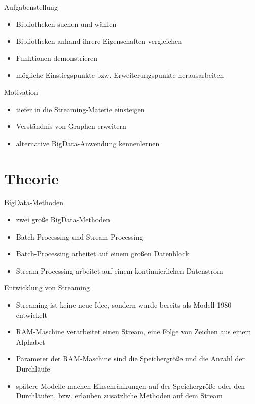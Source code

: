 \documentclass[a4paper, fontsize=11pt]{beamer}
\begin{document}
\begin{frame}{Aufgabenstellung}
    \begin{itemize}
        \item Bibliotheken suchen und wählen
        \item Bibliotheken anhand ihrere Eigenschaften vergleichen
        \item Funktionen demonstrieren
        \item mögliche Einstiegspunkte bzw. Erweiterungspunkte herausarbeiten
    \end{itemize}
\end{frame}

\begin{frame}{Motivation}
    \begin{itemize}
        \item tiefer in die Streaming-Materie einsteigen
        \item Verständnis von Graphen erweitern
        \item alternative BigData-Anwendung kennenlernen
    \end{itemize}
\end{frame}

\section{Theorie}
\begin{frame}{BigData-Methoden}
    \begin{itemize}
        \item zwei große BigData-Methoden
        \item Batch-Processing und Stream-Processing
        \item Batch-Processing arbeitet auf einem großen Datenblock
        \item Stream-Processing arbeitet auf einem kontinuierlichen Datenstrom
    \end{itemize}
\end{frame}

\begin{frame}{Entwicklung von Streaming}
    \begin{itemize}
        \item Streaming ist keine neue Idee, sondern wurde bereits als Modell
            1980 entwickelt
        \item RAM-Maschine verarbeitet einen Stream, eine Folge von Zeichen aus
            einem Alphabet
        \item Parameter der RAM-Maschine sind die Speichergröße und die Anzahl
            der Durchläufe
        \item spätere Modelle machen Einschränkungen auf der Speichergröße
            oder den Durchläufen, bzw. erlauben zusätzliche Methoden auf dem
            Stream
    \end{itemize}
\end{frame}
\end{document}

